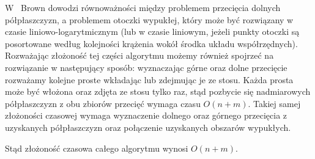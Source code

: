 W~\cite{Brown78} Brown dowodzi równoważności między problemem
przecięcia dolnych półpłaszczyzn, a problemem otoczki wypukłej, który
może być rozwiązany w czasie liniowo-logarytmicznym (lub w czasie
liniowym, jeżeli punkty otoczki są posortowane według kolejności
krążenia wokół środka układu współrzędnych). Rozważając złożoność tej
części algorytmu możemy również spojrzeć na rozwiązanie w następujący
sposób: wyznaczając górne oraz dolne przecięcie rozważamy kolejne
proste wkładając lub zdejmując je ze stosu. Każda prosta może być
włożona oraz zdjęta ze stosu tylko raz, stąd pozbycie się nadmiarowych
półpłaszczyzn z obu zbiorów przecięć wymaga czasu $O(n + m)$. Takiej
samej złożoności czasowej wymaga wyznaczenie dolnego oraz górnego
przecięcia z uzyskanych półpłaszczyzn oraz połączenie uzyskanych
obszarów wypukłych.

Stąd złożoność czasowa całego algorytmu wynosi $O(n + m)$.

